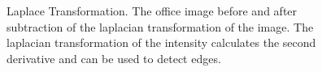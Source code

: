 \documentclass[11pt,a4paper]{article}
\begin{document}
\begin{figure}%
\centering
{}
\quad
{}
\quad
{}

\caption{Laplace Transformation. The office image before and after subtraction of the laplacian transformation of the image. The laplacian transformation of the intensity calculates the second derivative and can be used to detect edges.}%
\label{fig:lap}%
\end{figure}
\end{document}
